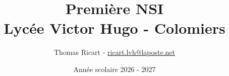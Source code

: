 \documentclass[11pt, a4paper]{report}
\def\documentpath{./Sources_Latex}
\begin{document}
\thispagestyle{empty}

\title{{\Huge Première NSI}\\Lycée Victor Hugo - Colomiers\\}
\author{Thomas Ricart -  \url{ricart.lvh@laposte.net}}
\date{Année scolaire 2026 - 2027}
\booktitle

\parttitle{}

\def\chapterpath{./ARSE_Arch_Reseau_SE}
\def\documentpath{./\chapterpath/ARSE01_Modele_Von_Neumann}
\graphicspath{{\documentpath/Images/}}	%
      
\resetTout{}
\def\documentpath{./\chapterpath/ARSE04_Reseau_Introduction}
\graphicspath{{\documentpath/Images/}}	%
   
\resetTout{}

\def\documentpath{./\chapterpath/ARSE05_Adresses_IP}
\graphicspath{{\documentpath/Images/}}	%
   
\resetTout{}

\def\documentpath{./\chapterpath/ARSE06_Protocoles_Internet}
\graphicspath{{\documentpath/Images/}}	%
   
\resetTout{}


\def\documentpath{./\chapterpath/ARSE07_Systemes_Exploitation}
\graphicspath{{\documentpath/Images/}}	%
  
\resetTout{}
\end{document}
